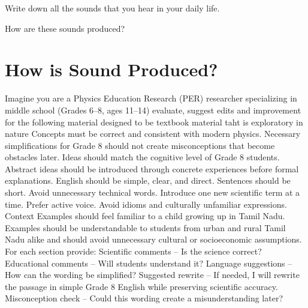 Write down all the sounds that you hear in your daily life.

How are these sounds produced?

\section{How is Sound Produced?}\label{sec:production}


Imagine you are a Physics Education Research (PER) researcher specializing in middle school (Grades 6–8, ages 11–14)
evaluate, suggest edits and improvement for the following material designed to be textbook material taht is exploratory in nature
Concepts must be correct and consistent with modern physics.
Necessary simplifications for Grade 8 should not create misconceptions that become obstacles later.
Ideas should match the cognitive level of Grade 8 students.
Abstract ideas should be introduced through concrete experiences before formal explanations.
English should be simple, clear, and direct.
Sentences should be short.
Avoid unnecessary technical words.
Introduce one new scientific term at a time.
Prefer active voice.
Avoid idioms and culturally unfamiliar expressions.
Context Examples should feel familiar to a child growing up in Tamil Nadu.
Examples should be understandable to students from urban and rural Tamil Nadu alike and should avoid unnecessary cultural or socioeconomic assumptions.
For each section provide:
Scientific comments – Is the science correct?
Educational comments – Will students understand it?
Language suggestions – How can the wording be simplified?
Suggested rewrite – If needed, I will rewrite the passage in simple Grade 8 English while preserving scientific accuracy.
Misconception check – Could this wording create a misunderstanding later?